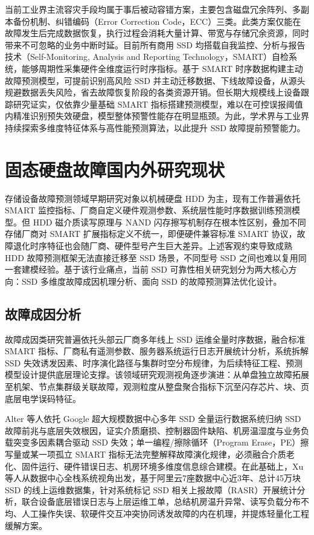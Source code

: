 当前工业界主流容灾手段均属于事后被动容错方案，主要包含磁盘冗余阵列、多副本备份机制\cite{jaffer2020reliability}、纠错编码（Error Correction Code，ECC）\cite{huang2014flexecc}三类。此类方案仅能在故障发生后完成数据恢复，执行过程会消耗大量计算、带宽与存储冗余资源，同时带来不可忽略的业务中断时延。目前所有商用 SSD 均搭载自我监控、分析与报告技术（Self-Monitoring, Analysis and Reporting Technology，SMART）自检系统，能够周期性采集硬件全维度运行时序指标。基于 SMART 时序数据构建主动故障预测模型，可提前识别高风险 SSD 并主动迁移数据、下线故障设备，从源头规避数据丢失风险，省去故障恢复阶段的各类资源开销。但长期大规模线上设备跟踪研究证实，仅依靠少量基础 SMART 指标搭建预测模型，难以在可控误报阈值内精准识别预失效硬盘，模型整体预警性能存在明显瓶颈\cite{pinheiro2007failure}。为此，学术界与工业界持续探索多维度特征体系与高性能预测算法，以此提升 SSD 故障提前预警能力。

\section{固态硬盘故障国内外研究现状}
存储设备故障预测领域早期研究对象以机械硬盘 HDD 为主，现有工作普遍依托 SMART 监控指标、厂商自定义硬件观测参数、系统层性能时序数据训练预测模型。但 HDD 磁介质读写原理与 NAND 闪存擦写机制存在根本性区别，叠加不同存储厂商对 SMART 扩展指标定义不统一，即便硬件兼容标准 SMART 协议，故障退化时序特征也会随厂商、硬件型号产生巨大差异。上述客观约束导致成熟 HDD 故障预测框架无法直接迁移至 SSD 场景，不同型号 SSD 之间也难以复用同一套建模经验。基于该行业痛点，当前 SSD 可靠性相关研究划分为两大核心方向：SSD 多维度故障成因机理分析、面向 SSD 的故障预测算法优化设计。

\subsection{故障成因分析}
故障成因类研究普遍依托头部云厂商多年线上 SSD 运维全量时序数据，融合标准 SMART 指标、厂商私有遥测参数、服务器系统运行日志开展统计分析，系统拆解 SSD 失效诱发因素、时序演化路径与集群时空分布规律，为后续特征工程、预测模型设计提供底层理论支撑。该领域研究观测视角逐步演进：从单盘独立故障拓展至机架、节点集群级关联故障，观测粒度从整盘聚合指标下沉至闪存芯片、块、页底层电学误码特征。

Alter 等人依托 Google 超大规模数据中心多年 SSD 全量运行数据系统归纳 SSD 故障前兆与底层失效根因，证实介质磨损、控制器固件缺陷、机房温湿度与业务负载突变多因素耦合驱动 SSD 失效；单一编程/擦除循环（Program Erase，PE）擦写量或某一项孤立 SMART 指标无法完整解释故障演化规律，必须融合介质老化、固件运行、硬件错误日志、机房环境多维度信息综合建模\cite{alter2019ssd}。在此基础上，Xu 等人从数据中心全栈系统视角出发，基于阿里云7座数据中心近3年、总计45万块 SSD 的线上运维数据集，针对系统标记 SSD 相关上报故障（RASR）开展统计分析，联合设备底层错误日志与上层运维工单，总结机房温升异常、读写负载分布不均、人工操作失误、软硬件交互冲突协同诱发故障的内在机理，并提炼轻量化工程缓解方案\cite{xu2019lessons}。

